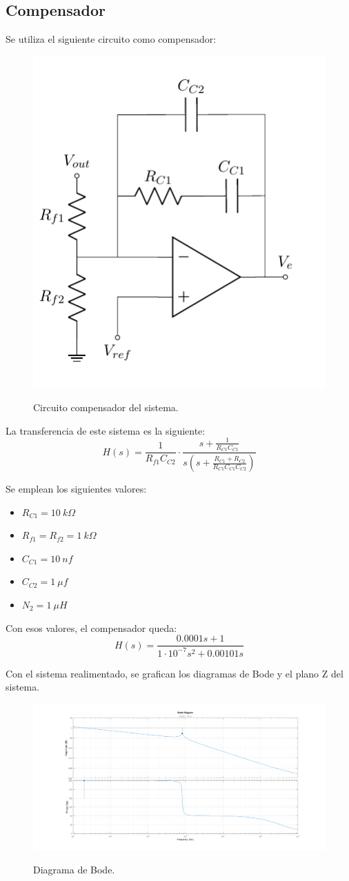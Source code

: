 \subsection{Compensador}

Se utiliza el siguiente circuito como compensador:
\begin{figure}[H]
	\centering
	\includegraphics[width=0.3\linewidth, page = 1]{ImagenesParteIII/CircuitsP3.pdf}
	\label{fig:compensador}
	\caption{Circuito compensador del sistema.}
\end{figure}

La transferencia de este sistema es la siguiente:
\begin{equation}
	H(s) = \frac{ 1 }{ R_{f1} C_{C2} } \cdot \frac{s + \frac{1}{ R_{C1} C_{C1}}}{ s \left( s + \frac{R_{C1} + R_{C2}}{R_{C1} C_{C1} C_{C2}} \right)}
\end{equation}

Se emplean los siguientes valores:
\begin{multicols}{2}
\begin{itemize}
	\item $R_{C1} = 10 \ k\Omega$
	\item $R_{f1} = R_{f2} = 1 \ k\Omega$
	\item $C_{C1} = 10 \ nf$
	\item $C_{C2} = 1 \ \mu f$
	\item $N_2 = 1 \ \mu H$
\end{itemize}
\end{multicols}

Con esos valores, el compensador queda:
\begin{equation}
	H(s) = \frac{0.0001 s + 1}{ 1 \cdot 10^{-7} s^2 + 0.00101 s }
\end{equation}

Con el sistema realimentado, se grafican los diagramas de Bode y el plano Z del sistema.
\begin{figure}[H]
	\centering
	\includegraphics[width=0.9\linewidth]{ImagenesParteIII/Bode.png}
	\label{fig:bode}
	\caption{Diagrama de Bode.}
\end{figure}

